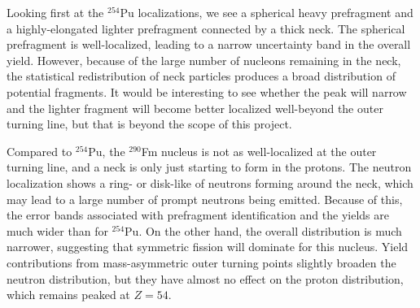 Looking first at the $^{254}$Pu localizations, we see a spherical heavy prefragment and a highly-elongated lighter prefragment connected by a thick neck. The spherical prefragment is well-localized, leading to a narrow uncertainty band in the overall yield. However, because of the large number of nucleons remaining in the neck, the statistical redistribution of neck particles produces a broad distribution of potential fragments. It would be interesting to see whether the peak will narrow and the lighter fragment will become better localized well-beyond the outer turning line, but that is beyond the scope of this project.


Compared to $^{254}$Pu, the $^{290}$Fm nucleus is not as well-localized at the outer turning line, and a neck is only just starting to form in the protons. The neutron localization shows a ring- or disk-like of neutrons forming around the neck, which may lead to a large number of prompt neutrons being emitted. Because of this, the error bands associated with prefragment identification and the yields are much wider than for $^{254}$Pu. On the other hand, the overall distribution is much narrower, suggesting that symmetric fission will dominate for this nucleus. Yield contributions from mass-asymmetric outer turning points slightly broaden the neutron distribution, but they have almost no effect on the proton distribution, which remains peaked at $Z=54$.

